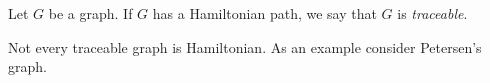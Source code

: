 \documentclass[12pt]{article}
\begin{document}
Let $G$ be a graph. If $G$ has a Hamiltonian path, we say that $G$ is \emph{traceable}.

Not every traceable graph is Hamiltonian. As an example consider Petersen's graph.
\end{document}
